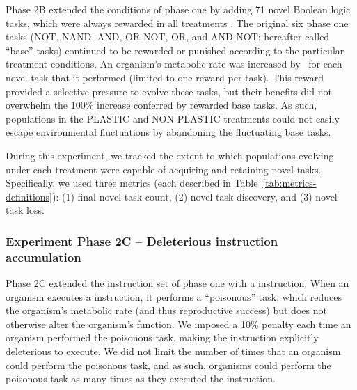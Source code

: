 Phase 2B extended the conditions of phase one by adding 71 novel Boolean logic tasks, which were always rewarded in all treatments \citep{ofria_avida:_2009}.
The original six phase one tasks (NOT, NAND, AND, OR-NOT, OR, and AND-NOT; hereafter called ``base'' tasks) continued to be rewarded or punished according to the particular treatment conditions.
An organism's metabolic rate was increased by \novelTraitsReward\ for each novel task that it performed (limited to one reward per task).
This reward provided a selective pressure to evolve these tasks, but their benefits did not overwhelm the 100\% increase conferred by rewarded base tasks. 
As such, populations in the PLASTIC and NON-PLASTIC treatments could not easily escape environmental fluctuations by abandoning the fluctuating base tasks.

During this experiment, we tracked the extent to which populations evolving under each treatment were capable of acquiring and retaining novel tasks.  
Specifically, we used three metrics (each described in Table~\ref{tab:metrics-definitions}):
(1) final novel task count,      %
(2) novel task discovery,    %
and (3) novel task loss. %

\vspace{5mm}
\subsubsection{Experiment Phase 2C -- Deleterious instruction accumulation}
\label{sec:methods:exp:deleterious-instruction-accumulation}

Phase 2C extended the instruction set of phase one with a  instruction.
When an organism executes a  instruction, it performs a ``poisonous'' task, which reduces the organism's metabolic rate (and thus reproductive success) but does not otherwise alter the organism's function.
We imposed a 10\% penalty each time an organism performed the poisonous task, making the  instruction explicitly deleterious to execute.
We did not limit the number of times that an organism could perform the poisonous task, and as such, organisms could perform the poisonous task as many times as they executed the  instruction. 

